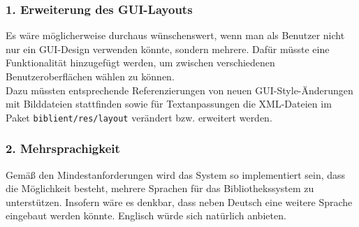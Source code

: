 \documentclass[fontsize=12pt,paper=a4,twoside]{scrartcl}
\begin{document}
\subsubsection*{1. Erweiterung des GUI-Layouts}

Es wäre möglicherweise durchaus wünschenswert, wenn man als Benutzer nicht nur ein GUI-Design verwenden könnte, sondern mehrere. Dafür müsste eine Funktionalität hinzugefügt werden, um zwischen verschiedenen Benutzeroberflächen wählen zu können. \\
Dazu müssten entsprechende Referenzierungen von neuen GUI-Style-Änderungen mit Bilddateien stattfinden sowie für Textanpassungen die XML-Dateien im Paket \texttt{biblient/res/layout} verändert bzw. erweitert werden. 

\subsubsection*{2. Mehrsprachigkeit}

Gemäß den Mindestanforderungen wird das System so implementiert sein, dass die Möglichkeit besteht, mehrere Sprachen für das Bibliothekssystem zu unterstützen. Insofern wäre es denkbar, dass neben Deutsch eine weitere Sprache eingebaut werden könnte. Englisch würde sich natürlich anbieten.
\end{document}
